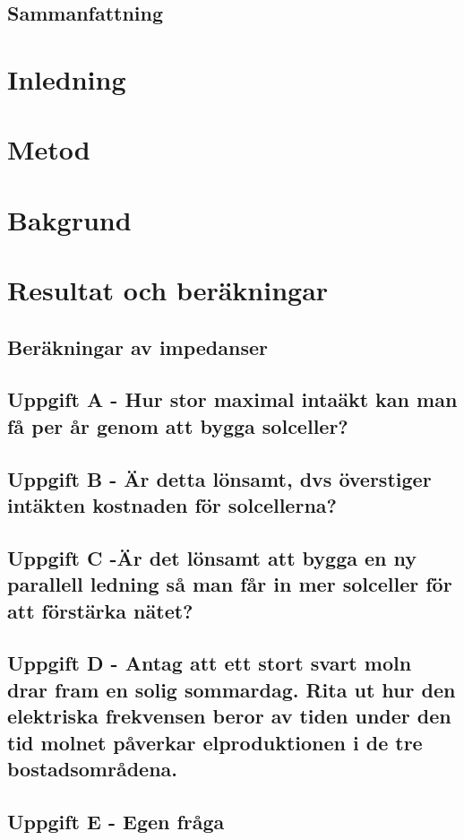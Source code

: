 \documentclass{report}
\title{}
\date{\today}
\author{Johanna Sörbom}
\begin{document}
\maketitle
\newpage
\begin{titlepage}
\section*{Sammanfattning}
\newpage
\tableofcontents
\end{titlepage}
\newpage
{}
\section{Inledning}
\section{Metod}
\section{Bakgrund}
\newpage
\section{Resultat och beräkningar}
\subsection{Beräkningar av impedanser}


\subsection{Uppgift A - Hur stor maximal intaäkt kan man få per år genom att bygga solceller?}
\subsection{Uppgift B - Är detta lönsamt, dvs överstiger intäkten kostnaden för solcellerna?}
\subsection{Uppgift C -Är det lönsamt att bygga en ny parallell ledning så man får in mer solceller för att förstärka nätet?}
\subsection{Uppgift D - Antag att ett stort svart moln drar fram en solig sommardag. Rita ut hur den elektriska frekvensen beror av tiden under den tid molnet påverkar elproduktionen i de tre bostadsområdena.}
\subsection{Uppgift E - Egen fråga}




 
\end{document}
